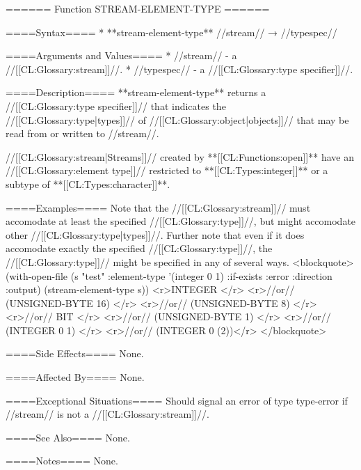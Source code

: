 ====== Function STREAM-ELEMENT-TYPE ======

====Syntax====
  * **stream-element-type** //stream// → //typespec//

====Arguments and Values====
  * //stream// - a //[[CL:Glossary:stream]]//.
  * //typespec// - a //[[CL:Glossary:type specifier]]//.

====Description====
**stream-element-type** returns a //[[CL:Glossary:type specifier]]// that indicates the //[[CL:Glossary:type|types]]// of //[[CL:Glossary:object|objects]]// that may be read from or written to //stream//.

//[[CL:Glossary:stream|Streams]]// created by **[[CL:Functions:open]]** have an //[[CL:Glossary:element type]]// restricted to **[[CL:Types:integer]]** or a subtype of **[[CL:Types:character]]**.

====Examples====
Note that the //[[CL:Glossary:stream]]// must accomodate at least the specified //[[CL:Glossary:type]]//, but might accomodate other //[[CL:Glossary:type|types]]//. Further note that even if it does accomodate exactly the specified //[[CL:Glossary:type]]//, the //[[CL:Glossary:type]]// might be specified in any of several ways. 
<blockquote>
(with-open-file (s "test" :element-type '(integer 0 1) 
                          :if-exists :error 
                          :direction :output) 
  (stream-element-type s)) 
<r>INTEGER </r>
<r>//or// (UNSIGNED-BYTE 16) </r>
<r>//or// (UNSIGNED-BYTE 8) </r>
<r>//or// BIT </r>
<r>//or// (UNSIGNED-BYTE 1) </r>
<r>//or// (INTEGER 0 1) </r>
<r>//or// (INTEGER 0 (2))</r>
</blockquote>

====Side Effects====
None.

====Affected By====
None.

====Exceptional Situations====
Should signal an error of type type-error if //stream// is not a //[[CL:Glossary:stream]]//.

====See Also====
None.

====Notes====
None.

